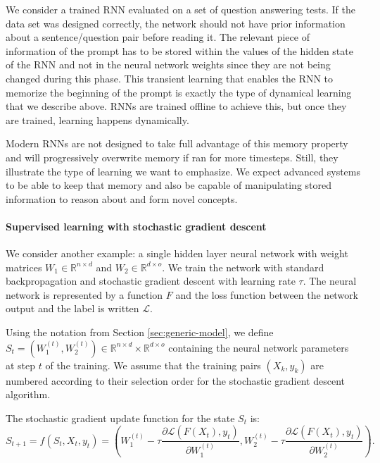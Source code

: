 We consider a trained \ac{RNN} evaluated on a set of question answering tests. If
the data set was designed correctly, the network should not have prior
information about a sentence/question pair before reading it. The
relevant piece of information of the prompt has to be stored within the values of the hidden
state of the \ac{RNN} and not in the neural network weights since they are not
being changed during this phase. This transient learning that enables the
\ac{RNN} to memorize the beginning of the prompt is exactly the type of
dynamical learning that we describe above. \acp{RNN} are trained offline to achieve this,
but once they are trained, learning happens dynamically.

Modern \acp{RNN} are not designed to take full advantage of this memory
property and will progressively overwrite memory if ran for more timesteps.
Still, they illustrate the type of learning we want to emphasize. We expect
advanced systems to be able to keep that memory and also be capable of
manipulating stored information to reason about and form novel concepts.

\paragraph{Supervised learning with stochastic gradient descent}
\label{sec:superv-learn-with}
We consider another example: a single hidden layer neural network with weight
matrices $W_1 \in \mathbb{R}^{n \times d}$ and $W_2 \in \mathbb{R}^{d \times o}$. We train the network with
standard backpropagation and stochastic gradient descent with learning rate $\tau$.
The neural network is represented by a function $F$ and the loss function
between the network output and the label is written $\mathcal{L}$.

Using the notation from Section \ref{sec:generic-model}, we define
$S_{t} = \left(W_{1}^{(t)}, W_{2}^{(t)}\right) \in \mathbb{R}^{n \times d} \times \mathbb{R}^{d \times o}$
containing the neural network parameters at step $t$ of the training. We assume that
the training pairs $(X_{k}, y_{k})$ are numbered according to their selection
order for the stochastic gradient descent algorithm.

The stochastic gradient update function for the state $S_{t}$ is:
\begin{equation}
  \label{eq:supervised-learning}
  S_{t+1} = {f}(S_t, X_t, y_t) = \left(W_1^{(t)} - \tau \frac{\partial
      \mathcal{L}(F(X_t), y_t)}{\partial W_1^{(t)}}, W_2^{(t)} - \tau \frac{\partial
      \mathcal{L}(F(X_t), y_t)}{\partial W_2^{(t)}} \right).
\end{equation}

